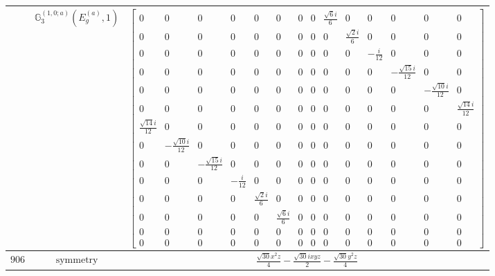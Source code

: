 \documentclass[fleqn,8pt,landscape]{jsarticle}
\begin{document}
\begin{longtable}{ccc}
$  $ & $ \mathbb{G}_{3}^{(1,0;a)}(E_{g}^{(a)},1) $ & $ \begin{bmatrix} 0 & 0 & 0 & 0 & 0 & 0 & 0 & 0 & \frac{\sqrt{6} i}{6} & 0 & 0 & 0 & 0 & 0 \\ 0 & 0 & 0 & 0 & 0 & 0 & 0 & 0 & 0 & \frac{\sqrt{2} i}{6} & 0 & 0 & 0 & 0 \\ 0 & 0 & 0 & 0 & 0 & 0 & 0 & 0 & 0 & 0 & - \frac{i}{12} & 0 & 0 & 0 \\ 0 & 0 & 0 & 0 & 0 & 0 & 0 & 0 & 0 & 0 & 0 & - \frac{\sqrt{15} i}{12} & 0 & 0 \\ 0 & 0 & 0 & 0 & 0 & 0 & 0 & 0 & 0 & 0 & 0 & 0 & - \frac{\sqrt{10} i}{12} & 0 \\ 0 & 0 & 0 & 0 & 0 & 0 & 0 & 0 & 0 & 0 & 0 & 0 & 0 & \frac{\sqrt{14} i}{12} \\ \frac{\sqrt{14} i}{12} & 0 & 0 & 0 & 0 & 0 & 0 & 0 & 0 & 0 & 0 & 0 & 0 & 0 \\ 0 & - \frac{\sqrt{10} i}{12} & 0 & 0 & 0 & 0 & 0 & 0 & 0 & 0 & 0 & 0 & 0 & 0 \\ 0 & 0 & - \frac{\sqrt{15} i}{12} & 0 & 0 & 0 & 0 & 0 & 0 & 0 & 0 & 0 & 0 & 0 \\ 0 & 0 & 0 & - \frac{i}{12} & 0 & 0 & 0 & 0 & 0 & 0 & 0 & 0 & 0 & 0 \\ 0 & 0 & 0 & 0 & \frac{\sqrt{2} i}{6} & 0 & 0 & 0 & 0 & 0 & 0 & 0 & 0 & 0 \\ 0 & 0 & 0 & 0 & 0 & \frac{\sqrt{6} i}{6} & 0 & 0 & 0 & 0 & 0 & 0 & 0 & 0 \\ 0 & 0 & 0 & 0 & 0 & 0 & 0 & 0 & 0 & 0 & 0 & 0 & 0 & 0 \\ 0 & 0 & 0 & 0 & 0 & 0 & 0 & 0 & 0 & 0 & 0 & 0 & 0 & 0 \end{bmatrix} $ \\ \hline
$ 906 $ & $ \text{symmetry} $ & $ \frac{\sqrt{30} x^{2} z}{4} - \frac{\sqrt{30} i x y z}{2} - \frac{\sqrt{30} y^{2} z}{4} $ \\

\end{longtable}
\end{document}
